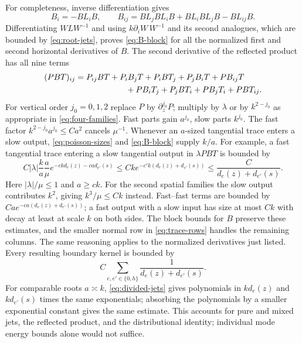 \documentclass[11pt]{article}
\numberwithin{equation}{section}
\theoremstyle{remark}
\begin{document}
For completeness, inverse differentiation gives
\[
 B_i=-BL_iB,\qquad
 B_{ij}=BL_jBL_iB+BL_iBL_jB-BL_{ij}B.
\]
Differentiating $WLW^{-1}$ and using
$k\partial_iW\,W^{-1}$ and its second analogues, which are bounded
by \eqref{eq:root-jets}, proves \eqref{eq:B-block} for all the
normalized first and second horizontal derivatives of $B$. The second
derivative of the reflected
product has all nine terms
\begin{align}\label{eq:nine-terms}
 &(PBT)_{ij}=P_{ij}BT+P_iB_jT+P_iBT_j+P_jB_iT+PB_{ij}T\notag\\
 &\hspace{35mm}{}+PB_iT_j+P_jBT_i+PB_jT_i+PBT_{ij}.
\end{align}
For vertical order $j_0=0,1,2$ replace $P$ by $\partial_z^{j_0}P$;
multiply by $\lambda$ or by $k^{2-j_0}$ as appropriate in
\eqref{eq:four-families}. Fast parts gain $a^{j_0}$, slow parts
$k^{j_0}$. The fast factor $k^{2-j_0}a^{j_0}\leq Ca^2$ cancels
$\mu^{-1}$. Whenever an $a$-sized tangential trace enters a slow
output, \eqref{eq:poisson-sizes} and \eqref{eq:B-block} supply $k/a$.
For example, a fast tangential trace entering a slow tangential output
in $\lambda PBT$ is bounded by
\[
 C|\lambda|\frac{k}{a}\frac{a}{\mu}
 e^{-ckd_e(z)-ca d_{e'}(s)}
 \leq Ck e^{-c'k(d_e(z)+d_{e'}(s))}
 \leq\frac{C}{d_e(z)+d_{e'}(s)}.
\]
Here $|\lambda|/\mu\leq1$ and $a\geq ck$. For the second spatial
families the slow output contributes $k^2$, giving
$k^3/\mu\leq Ck$ instead. Fast--fast terms are bounded by
$Ca e^{-ca(d_e(z)+d_{e'}(s))}$; a fast output with a slow input
has size at most $Ck$ with decay at least at scale $k$ on both sides.
The block bounds for $B$ preserve these estimates, and the smaller
normal row in \eqref{eq:trace-rows} handles the remaining columns.
The same reasoning applies to the normalized derivatives just listed.
Every resulting boundary kernel is bounded by
\begin{equation}\label{eq:hardy-bound}
 C\sum_{e,e'\in\{0,h\}}
 \frac1{d_e(z)+d_{e'}(s)}.
\end{equation}
For comparable roots $a\asymp k$, \eqref{eq:divided-jets} gives
polynomials in $kd_e(z)$ and $kd_{e'}(s)$ times the same
exponentials; absorbing the polynomials by a smaller exponential
constant gives the same estimate.
This accounts for pure and mixed jets, the reflected product, and the
distributional identity; individual mode energy bounds alone would not suffice.
\end{document}
